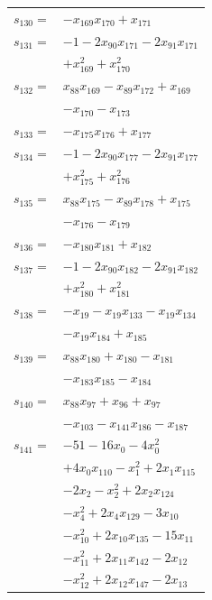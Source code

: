 \begin{longtable}{@{}r@{\;}l@{}}
\(s_{130}=\) & \(\displaystyle -x_{169}x_{170} +x_{171}\) \\[3pt]
\(s_{131}=\) & \(\displaystyle -1 -2x_{90}x_{171} -2x_{91}x_{171}\) \\
 & \(\displaystyle +x_{169}^{2} +x_{170}^{2}\) \\[3pt]
\(s_{132}=\) & \(\displaystyle x_{88}x_{169} -x_{89}x_{172} +x_{169}\) \\
 & \(\displaystyle -x_{170} -x_{173}\) \\[3pt]
\(s_{133}=\) & \(\displaystyle -x_{175}x_{176} +x_{177}\) \\[3pt]
\(s_{134}=\) & \(\displaystyle -1 -2x_{90}x_{177} -2x_{91}x_{177}\) \\
 & \(\displaystyle +x_{175}^{2} +x_{176}^{2}\) \\[3pt]
\(s_{135}=\) & \(\displaystyle x_{88}x_{175} -x_{89}x_{178} +x_{175}\) \\
 & \(\displaystyle -x_{176} -x_{179}\) \\[3pt]
\(s_{136}=\) & \(\displaystyle -x_{180}x_{181} +x_{182}\) \\[3pt]
\(s_{137}=\) & \(\displaystyle -1 -2x_{90}x_{182} -2x_{91}x_{182}\) \\
 & \(\displaystyle +x_{180}^{2} +x_{181}^{2}\) \\[3pt]
\(s_{138}=\) & \(\displaystyle -x_{19} -x_{19}x_{133} -x_{19}x_{134}\) \\
 & \(\displaystyle -x_{19}x_{184} +x_{185}\) \\[3pt]
\(s_{139}=\) & \(\displaystyle x_{88}x_{180} +x_{180} -x_{181}\) \\
 & \(\displaystyle -x_{183}x_{185} -x_{184}\) \\[3pt]
\(s_{140}=\) & \(\displaystyle x_{88}x_{97} +x_{96} +x_{97}\) \\
 & \(\displaystyle -x_{103} -x_{141}x_{186} -x_{187}\) \\[3pt]
\(s_{141}=\) & \(\displaystyle -51 -16x_{0} -4x_{0}^{2}\) \\
 & \(\displaystyle +4x_{0}x_{110} -x_{1}^{2} +2x_{1}x_{115}\) \\
 & \(\displaystyle -2x_{2} -x_{2}^{2} +2x_{2}x_{124}\) \\
 & \(\displaystyle -x_{4}^{2} +2x_{4}x_{129} -3x_{10}\) \\
 & \(\displaystyle -x_{10}^{2} +2x_{10}x_{135} -15x_{11}\) \\
 & \(\displaystyle -x_{11}^{2} +2x_{11}x_{142} -2x_{12}\) \\
 & \(\displaystyle -x_{12}^{2} +2x_{12}x_{147} -2x_{13}\) \\

\end{longtable}
